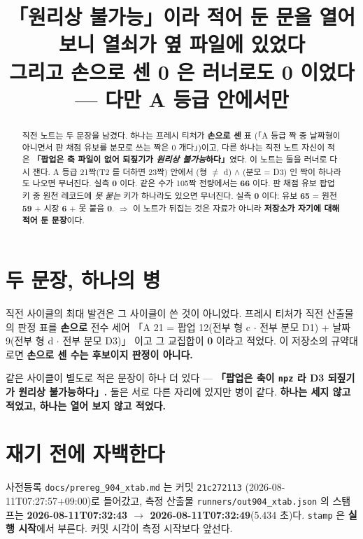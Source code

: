 \documentclass{article}
\title{「원리상 불가능」이라 적어 둔 문을 열어 보니 열쇠가 옆 파일에 있었다 \\
  {\large 그리고 손으로 센 0 은 러너로도 0 이었다 --- 다만 A 등급 안에서만}}
\begin{document}
\maketitle

\begin{abstract}
직전 노트는 두 문장을 남겼다. 하나는 프레시 티처가 \textbf{손으로 센} 표
(「A 등급 짝 중 날짜형이 아니면서 판 채점 유보를 분모로 쓰는 짝은 0 개다」)이고,
다른 하나는 직전 노트 자신이 적은 \textbf{「팝업은 축 파일이 없어 되짚기가
\emph{원리상 불가능}하다」}였다. 이 노트는 둘을 러너로 다시 잰다.
{A 등급 21짝(T2 를 더하면 23짝) 안에서 (형 $\neq$ d) $\wedge$ (분모 = D3) 인 짝이
하나라도 나오면 무너진다. 실측 \textbf{0} 이다. 같은 수가 105짝 전량에서는 \textbf{66} 이다.}
{판 채점 유보 팝업 키 중 원천 레코드에 \emph{못 붙는} 키가 하나라도 있으면 무너진다.
실측 \textbf{0} 이다: 유보 \textbf{65} = 원천 \textbf{59} + 시장 \textbf{6} + 못 붙음 \textbf{0}.}
$\Rightarrow$ 이 노트가 뒤집는 것은 자료가 아니라 \textbf{저장소가 자기에 대해 적어 둔 문장}이다.
\end{abstract}

\section{두 문장, 하나의 병}

직전 사이클의 최대 발견은 그 사이클이 쓴 것이 아니었다.
프레시 티처가 직전 산출물의 판정 표를 \textbf{손으로} 전수 세어
「A 21 = 팝업 12(전부 형 c $\cdot$ 전부 분모 D1) + 날짜 9(전부 형 d $\cdot$ 전부 분모 D3)」
이고 그 교집합이 \textbf{0} 이라고 적었다.
이 저장소의 규약대로면 \textbf{손으로 센 수는 후보이지 판정이 아니다.}

같은 사이클이 별도로 적은 문장이 하나 더 있다 ---
\textbf{「팝업은 축이 \texttt{npz} 라 D3 되짚기가 원리상 불가능하다」.}
둘은 서로 다른 자리에 있지만 병이 같다.
\textbf{하나는 세지 않고 적었고, 하나는 열어 보지 않고 적었다.}

\section{재기 전에 자백한다}

사전등록 \texttt{docs/prereg\_904\_xtab.md} 는 커밋 \texttt{21c272113}
(2026-08-11T07:27:57+09:00)로 들어갔고, 측정 산출물 \texttt{runners/out904\_xtab.json} 의
스탬프는 \textbf{2026-08-11T07:32:43 $\to$ 2026-08-11T07:32:49}(5.434 초)다.
\texttt{stamp} 은 \textbf{실행 시작}에서 부른다. 커밋 시각이 측정 시작보다 앞선다.
\end{document}
